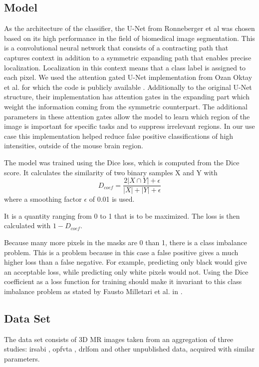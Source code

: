 \subsection{Model}
As the architecture of the classifier, the U-Net from Ronneberger et al \cite{ronneberger_u-net:_2015} was chosen based on its high performance in the field of biomedical image segmentation.
This is a convolutional neural network that consists of a contracting path that captures context in addition to a symmetric expanding path that enables precise localization.
Localization in this context means that a class label is assigned to each pixel.
We used the attention gated U-Net implementation from Ozan Oktay et al. \cite{oktay_attention} for which the code is publicly available \cite{oktay_ozan-oktayattention-gated-networks_2020}.
Additionally to the original U-Net structure, their implementation has attention gates in the expanding part which weight the information coming from the symmetric counterpart.
The additional parameters in these attention gates allow the model to learn which region of the image is important for specific tasks and to suppress irrelevant regions.
In our use case this implementation helped reduce false positive classifications of high intensities, outside of the mouse brain region.

The model was trained using the Dice loss, which is computed from the Dice score.
It calculates the similarity of two binary samples X and Y with
\begin{equation}\label{eqDcoef}
D_{coef} = \frac {2|X\cap Y| + \epsilon}{|X|+|Y| + \epsilon}
\end{equation}
where a smoothing factor $\epsilon$ of 0.01 is used.

It is a quantity ranging from 0 to 1 that is to be maximized.
The loss is then calculated with $1-D_{coef}$.

Because many more pixels in the masks are 0 than 1, there is a class imbalance problem.
This is a problem because in this case a false positive gives a much higher loss than a false negative.
For example, predicting only black would give an acceptable loss, while predicting only white pixels would not.
Using the Dice coefficient as a loss function for training should make it invariant to this class imbalance problem as stated by Fausto Milletari et al. in \cite{milletari_v-net:_2016}.

\subsection{Data Set} \label{subsec:Data Set}
The data set consists of 3D MR images taken from an aggregation of three studies: irsabi \cite{irsabi_bidsdata}, opfvta \cite{ioanas_whole-brain_nodate}, drlfom \cite{ioanas_effects_nodate} and other unpublished data, acquired with similar parameters.

